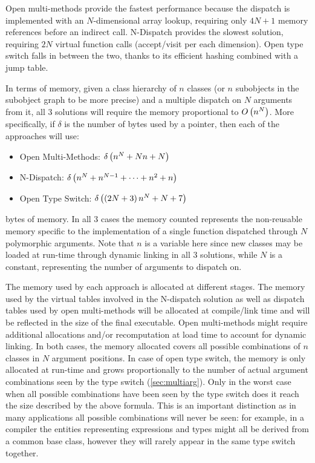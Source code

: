 Open multi-methods provide the fastest performance because the dispatch is 
implemented with an $N$-dimensional array lookup, requiring only $4N+1$ memory 
references before an indirect call. N-Dispatch provides the slowest solution, 
requiring $2N$ virtual function calls (accept/visit per each dimension). Open 
type switch falls in between the two, thanks to its efficient hashing combined 
with a jump table.

In terms of memory, given a class hierarchy of $n$ classes (or $n$ subobjects in 
the subobject graph to be more precise) and a multiple dispatch on $N$ arguments 
from it, all 3 solutions will require the memory proportional to $O\left(n^N\right)$. 
More specifically, if $\delta$ is the number of bytes used by a pointer, then 
each of the approaches will use:

\begin{itemize}
\setlength{\itemsep}{0pt}
\setlength{\parskip}{0pt}
\item Open Multi-Methods: $\delta\left(n^N+Nn+N\right)$
\item N-Dispatch: $\delta\left(n^N+n^{N-1}+\cdots+n^2+n\right)$
\item Open Type Switch: $\delta\left(\left(2N+3\right)n^N+N+7\right)$
\end{itemize}

\noindent
bytes of memory. In all 3 cases the memory counted represents the non-reusable 
memory specific to the implementation of a single function dispatched through 
$N$ polymorphic arguments. Note that $n$ is a variable here since new classes 
may be loaded at run-time through dynamic linking in all 3 solutions, while $N$ 
is a constant, representing the number of arguments to dispatch on.

The memory used by each approach is allocated at different stages. The memory 
used by the virtual tables involved in the N-dispatch solution as well as 
dispatch tables used by open multi-methods will be allocated at compile/link 
time and will be reflected in the size of the final executable. Open 
multi-methods might require additional allocations and/or recomputation at load 
time to account for dynamic linking. In both cases, the memory allocated covers 
all possible combinations of $n$ classes in $N$ argument positions. In case of 
open type switch, the memory is only allocated at run-time and grows proportionally 
to the number of actual argument combinations seen by the type switch 
(\textsection\ref{sec:multiarg}). Only in the worst case when all possible 
combinations have been seen by the type switch does it reach the size described 
by the above formula. This is an important distinction as in many applications 
all possible combinations will never be seen: for example, in a compiler the 
entities representing expressions and types might all be derived from a common 
base class, however they will rarely appear in the same type switch together.

